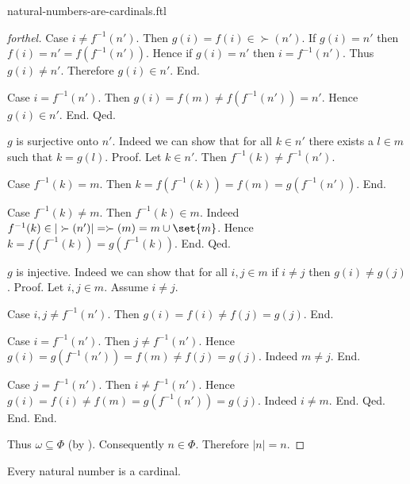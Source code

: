 \documentclass{naproche-library}
\begin{document}
\begin{smodule}[title=Natural Numbers are Cardinal Numbers]{natural-numbers-are-cardinals.ftl}
\begin{proof}[forthel]
        Case $i \neq f^{-1}(n')$.
          Then $g(i) = f(i) \in \succ(n')$.
          If $g(i) = n'$ then $f(i) = n' = f(f^{-1}(n'))$.
          Hence if $g(i) = n'$ then $i = f^{-1}(n')$.
          Thus $g(i) \neq n'$.
          Therefore $g(i) \in n'$.
        End.

        Case $i = f^{-1}(n')$.
          Then $g(i)
            = f(m)
            \neq f(f^{-1}(n'))
            = n'$.
          Hence $g(i) \in n'$.
        End.
      Qed.

      $g$ is surjective onto $n'$.
      Indeed we can show that for all $k \in n'$ there exists a $l \in m$ such that $k = g(l)$. \newline
      Proof.
        Let $k \in n'$.
        Then $f^{-1}(k) \neq f^{-1}(n')$.

        Case $f^{-1}(k) = m$.
          Then $k
            = f(f^{-1}(k))
            = f(m)
            = g(f^{-1}(n'))$.
        End.

        Case $f^{-1}(k) \neq m$.
          Then $f^{-1}(k) \in m$.
          Indeed $f^{-1}(k) \in |\succ(n')| = \succ(m) = m \cup \set{m}$.
          Hence $k
            = f(f^{-1}(k))
            = g(f^{-1}(k))$.
        End.
      Qed.

      $g$ is injective.
      Indeed we can show that for all $i, j \in m$ if $i \neq j$ then $g(i) \neq g(j)$. \newline
      Proof.
        Let $i, j \in m$.
        Assume $i \neq j$.

        Case $i, j \neq f^{-1}(n')$.
          Then $g(i)
            = f(i)
            \neq f(j)
            = g(j)$.
        End.

        Case $i = f^{-1}(n')$.
          Then $j \neq f^{-1}(n')$.
          Hence $g(i)
            = g(f^{-1}(n'))
            = f(m)
            \neq f(j)
            = g(j)$.
          Indeed $m \neq j$.
        End.

        Case $j = f^{-1}(n')$.
          Then $i \neq f^{-1}(n')$.
          Hence $g(i)
            = f(i)
            \neq f(m)
            = g(f^{-1}(n'))
            = g(j)$.
          Indeed $i \neq m$.
        End.
      Qed.
    End.
  End.

  Thus $\omega \subseteq \Phi$ (by ).
  Consequently $n \in \Phi$.
  Therefore $|n| = n$.
\end{proof}

\begin{corollary}[forthel,id=SET_THEORY_07_7061392098066432]
  Every natural number is a cardinal.
\end{corollary}
\end{smodule}
\end{document}
